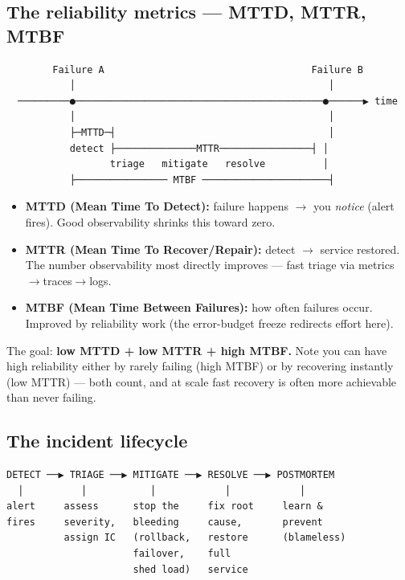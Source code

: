 \documentclass[11pt]{article}
\providecommand{\tightlist}{\setlength{\itemsep}{1pt}\setlength{\parskip}{0pt}}
\begin{document}
\subsection{The reliability metrics --- MTTD, MTTR, MTBF}\label{the-reliability-metrics--mttd-mttr-mtbf}

\setcodelang{}

\begin{verbatim}
        Failure A                                    Failure B
           │                                            │
  ─────────●───────────────────────────────────────────●──────▶ time
           │                                            │
           ├─MTTD─┤                                     │
           detect ├──────────────MTTR────────────────┤ │
                  triage   mitigate   resolve          │
           ├──────────────── MTBF ──────────────────────┤
\end{verbatim}

\begin{itemize}
\tightlist
\item
  \textbf{MTTD (Mean Time To Detect):} failure happens \(\rightarrow\) you \emph{notice} (alert fires). Good observability shrinks this toward zero.
\item
  \textbf{MTTR (Mean Time To Recover/Repair):} detect \(\rightarrow\) service restored. The number observability most directly improves --- fast triage via metrics\(\rightarrow\)traces\(\rightarrow\)logs.
\item
  \textbf{MTBF (Mean Time Between Failures):} how often failures occur. Improved by reliability work (the error-budget freeze redirects effort here).
\end{itemize}

The goal: \textbf{low MTTD + low MTTR + high MTBF.} Note you can have high reliability either by rarely failing (high MTBF) or by recovering instantly (low MTTR) --- both count, and at scale fast recovery is often more achievable than never failing.

\subsection{The incident lifecycle}\label{the-incident-lifecycle}

\setcodelang{}

\begin{verbatim}
DETECT ──▶ TRIAGE ──▶ MITIGATE ──▶ RESOLVE ──▶ POSTMORTEM
  │          │           │            │            │
alert     assess      stop the     fix root     learn &
fires     severity,   bleeding     cause,       prevent
          assign IC   (rollback,   restore      (blameless)
                      failover,    full
                      shed load)   service
\end{verbatim}
\end{document}
